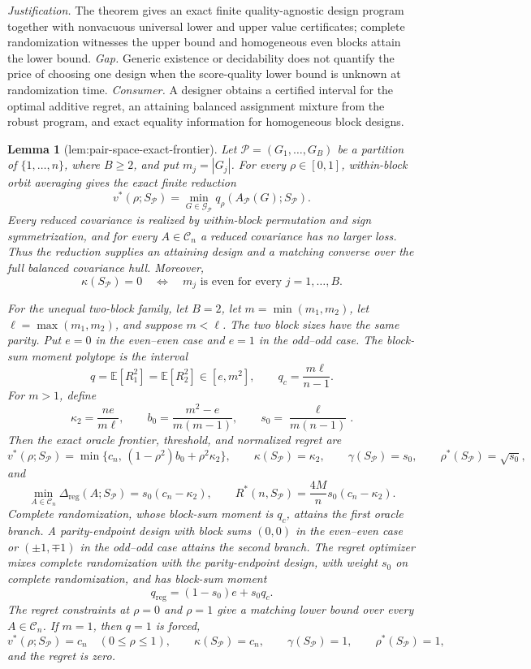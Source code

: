 \documentclass{article}
\newtheorem{lemma}{Lemma}
\begin{document}
\par\smallskip\noindent \textit{Justification.} The theorem gives an exact finite quality-agnostic design program together with nonvacuous universal lower and upper value certificates; complete randomization witnesses the upper bound and homogeneous even blocks attain the lower bound. \textit{Gap.} Generic existence or decidability does not quantify the price of choosing one design when the score-quality lower bound is unknown at randomization time. \textit{Consumer.} A designer obtains a certified interval for the optimal additive regret, an attaining balanced assignment mixture from the robust program, and exact equality information for homogeneous block designs.

\begin{lemma}[lem:pair-space-exact-frontier]\label{lem:pair-space-exact-frontier}
Let \(\mathcal P=(G_1,\ldots,G_B)\) be a partition of \(\{1,\ldots,n\}\), where \(B\geq2\), and put \(m_j=|G_j|\).  For every \(\rho\in[0,1]\), within-block orbit averaging gives the exact finite reduction
\[
v^*(\rho;S_{\mathcal P})
=\min_{G\in\mathcal G_{\mathcal P}}
q_\rho\!\left(A_{\mathcal P}(G);S_{\mathcal P}\right).
\]
Every reduced covariance is realized by within-block permutation and sign symmetrization, and for every \(A\in\mathcal C_n\) a reduced covariance has no larger loss.  Thus the reduction supplies an attaining design and a matching converse over the full balanced covariance hull.  Moreover,
\[
\kappa(S_{\mathcal P})=0
\quad\Longleftrightarrow\quad
m_j\text{ is even for every }j=1,\ldots,B.
\]

For the unequal two-block family, let \(B=2\), let \(m=\min(m_1,m_2)\), let \(\ell=\max(m_1,m_2)\), and suppose \(m<\ell\).  The two block sizes have the same parity.  Put \(e=0\) in the even--even case and \(e=1\) in the odd--odd case.  The block-sum moment polytope is the interval
\[
q=\mathbb E[R_1^2]=\mathbb E[R_2^2]\in[e,m^2],
\qquad
q_c=\frac{m\ell}{n-1}.
\]
For \(m>1\), define
\[
\kappa_2=\frac{ne}{m\ell},
\qquad
b_0=\frac{m^2-e}{m(m-1)},
\qquad
s_0=\frac{\ell}{m(n-1)}.
\]
Then the exact oracle frontier, threshold, and normalized regret are
\[
v^*(\rho;S_{\mathcal P})
=\min\{c_n,\,(1-\rho^2)b_0+\rho^2\kappa_2\},
\qquad
\kappa(S_{\mathcal P})=\kappa_2,
\qquad
\gamma(S_{\mathcal P})=s_0,
\qquad
\rho^*(S_{\mathcal P})=\sqrt{s_0},
\]
and
\[
\min_{A\in\mathcal C_n}\Delta_{\mathrm{reg}}(A;S_{\mathcal P})
=s_0(c_n-\kappa_2),
\qquad
R^*(n,S_{\mathcal P})
=\frac{4M}{n}s_0(c_n-\kappa_2).
\]
Complete randomization, whose block-sum moment is \(q_c\), attains the first oracle branch.  A parity-endpoint design with block sums \((0,0)\) in the even--even case or \((\pm1,\mp1)\) in the odd--odd case attains the second branch.  The regret optimizer mixes complete randomization with the parity-endpoint design, with weight \(s_0\) on complete randomization, and has block-sum moment
\[
q_{\mathrm{reg}}=(1-s_0)e+s_0q_c.
\]
The regret constraints at \(\rho=0\) and \(\rho=1\) give a matching lower bound over every \(A\in\mathcal C_n\).  If \(m=1\), then \(q=1\) is forced,
\[
v^*(\rho;S_{\mathcal P})=c_n\quad(0\leq\rho\leq1),
\qquad
\kappa(S_{\mathcal P})=c_n,
\qquad
\gamma(S_{\mathcal P})=1,
\qquad
\rho^*(S_{\mathcal P})=1,
\]
and the regret is zero.


\end{lemma}
\end{document}
